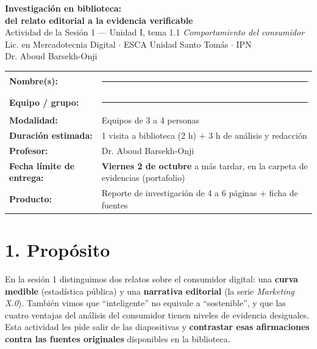 \documentclass[11pt,letterpaper]{article}
\begin{document}
\thispagestyle{fancy}

\begin{center}
  {\LARGE \textbf{Investigación en biblioteca:}}\\[3pt]
  {\LARGE \textbf{del relato editorial a la evidencia verificable}}\\[6pt]
  {\large Actividad de la Sesión 1 --- Unidad I, tema 1.1 \emph{Comportamiento del consumidor}}\\[4pt]
  {\small Lic. en Mercadotecnia Digital $\cdot$ ESCA Unidad Santo Tomás $\cdot$ IPN}\\[2pt]
  {\small Dr. Aboud Barsekh-Onji}
\end{center}

\begin{tabular}{@{}lp{10.5cm}@{}}
  \textbf{Nombre(s):} & \rule{9cm}{0.4pt} \\[4pt]
  \textbf{Equipo / grupo:} & \rule{9cm}{0.4pt} \\[4pt]
  \textbf{Modalidad:} & Equipos de 3 a 4 personas \\
  \textbf{Duración estimada:} & 1 visita a biblioteca (2 h) + 3 h de análisis y redacción \\
  \textbf{Profesor:} & Dr. Aboud Barsekh-Onji \\
  \textbf{Fecha límite de entrega:} & \textbf{Viernes 2 de octubre} a más tardar, en la carpeta de evidencias (portafolio) \\
  \textbf{Producto:} & Reporte de investigación de 4 a 6 páginas + ficha de fuentes \\
\end{tabular}

\vspace{0.2cm}

\section*{1. Propósito}

En la sesión 1 distinguimos dos relatos sobre el consumidor digital: una
\textbf{curva medible} (estadística pública) y una \textbf{narrativa editorial}
(la serie \textit{Marketing X.0}). También vimos que \enquote{inteligente} no
equivale a \enquote{sostenible}, y que las cuatro ventajas del análisis del
consumidor tienen niveles de evidencia desiguales. Esta actividad les pide
salir de las diapositivas y \textbf{contrastar esas afirmaciones contra las
fuentes originales} disponibles en la biblioteca.
\end{document}
